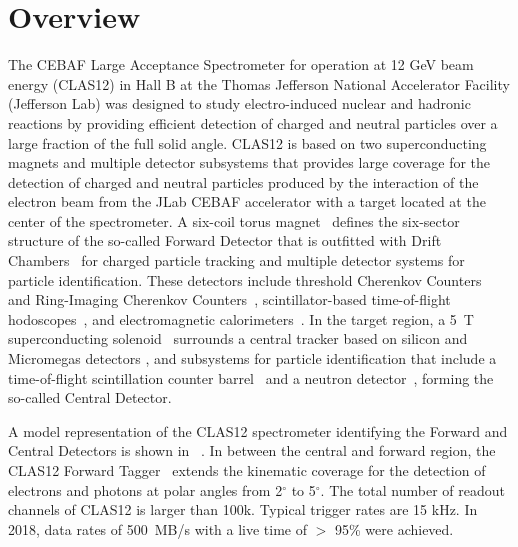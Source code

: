 \section{Overview}\label{overview}

The CEBAF Large Acceptance Spectrometer for operation at 12 GeV beam energy (CLAS12) \cite{clas12-nim} in Hall B at
the Thomas Jefferson National Accelerator Facility (Jefferson Lab) was designed to study
electro-induced nuclear and hadronic reactions by providing efficient detection of charged and neutral particles over a large
fraction of the full solid angle.
CLAS12 is based on two superconducting magnets and multiple detector subsystems that provides large
coverage for the detection of charged and neutral particles produced by the interaction of the electron beam
from the JLab CEBAF accelerator with a target located at the center of the spectrometer. A six-coil torus
magnet~\cite{magnets-nim} defines the six-sector structure of the so-called Forward Detector that is outfitted with Drift
Chambers~\cite{dc-nim} for charged particle tracking and multiple detector systems for particle identification.
These detectors include threshold Cherenkov Counters~\cite{ltcc-nim, htcc-nim} and Ring-Imaging Cherenkov
Counters~\cite{rich-nim}, scintillator-based time-of-flight hodoscopes~\cite{ftof-nim}, and electromagnetic
calorimeters~\cite{ec-nim}. In the target region, a 5~T superconducting solenoid~\cite{magnets-nim} surrounds a central tracker
based on silicon and Micromegas detectors \cite{svt-nim,mm-nim}, and subsystems for particle identification
that include a time-of-flight scintillation counter barrel~\cite{ctof-nim} and a neutron detector~\cite{cnd-nim},
forming the so-called Central Detector.

A model representation of the CLAS12 spectrometer identifying the Forward
and Central Detectors is shown in ~. In between the central and forward region, the CLAS12 Forward Tagger~\cite{ft-nim}
extends the kinematic coverage for the detection of electrons and photons at polar angles from 2$^\circ$ to
5$^\circ$. The total number of
readout channels of CLAS12 is larger than 100k. Typical trigger rates are 15 kHz. In 2018, data rates of
500~MB/s with a live time of $>$ 95\% were achieved.

